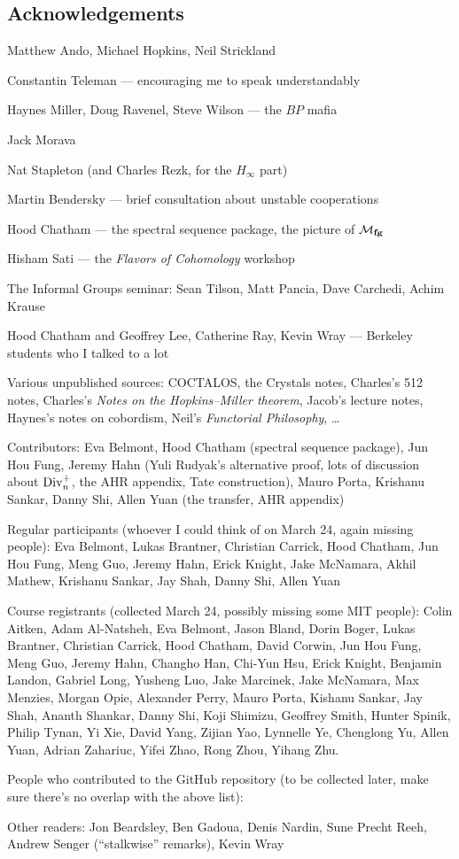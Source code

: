 


\newpage

\subsection*{Acknowledgements}

Matthew Ando, Michael Hopkins, Neil Strickland

Constantin Teleman --- encouraging me to speak understandably

Haynes Miller, Doug Ravenel, Steve Wilson --- the $BP$ mafia

Jack Morava

Nat Stapleton (and Charles Rezk, for the $H_\infty$ part)

Martin Bendersky --- brief consultation about unstable cooperations

Hood Chatham --- the spectral sequence package, the picture of $\mathcal{M}_{\mathbf{fg}}$

Hisham Sati --- the \textit{Flavors of Cohomology} workshop

The Informal Groups seminar: Sean Tilson, Matt Pancia, Dave Carchedi, Achim Krause

Hood Chatham and Geoffrey Lee, Catherine Ray, Kevin Wray --- Berkeley students who I talked to a lot

Various unpublished sources: COCTALOS, the Crystals notes, Charles's 512 notes, Charles's \textit{Notes on the Hopkins--Miller theorem}, Jacob's lecture notes, Haynes's notes on cobordism, Neil's \textit{Functorial Philosophy}, \ldots





Contributors: Eva Belmont, Hood Chatham (spectral sequence package), Jun Hou Fung, Jeremy Hahn (Yuli Rudyak's alternative proof, lots of discussion about $\operatorname{Div}_n^+$, the AHR appendix, Tate construction), Mauro Porta, Krishanu Sankar, Danny Shi, Allen Yuan (the transfer, AHR appendix)

Regular participants (whoever I could think of on March 24, again missing people): Eva Belmont, Lukas Brantner, Christian Carrick, Hood Chatham, Jun Hou Fung, Meng Guo, Jeremy Hahn, Erick Knight, Jake McNamara, Akhil Mathew, Krishanu Sankar, Jay Shah, Danny Shi, Allen Yuan

Course registrants (collected March 24, possibly missing some MIT people): Colin Aitken, Adam Al-Natsheh, Eva Belmont, Jason Bland, Dorin Boger, Lukas Brantner, Christian Carrick, Hood Chatham, David Corwin, Jun Hou Fung, Meng Guo, Jeremy Hahn, Changho Han, Chi-Yun Hsu, Erick Knight, Benjamin Landon, Gabriel Long, Yusheng Luo, Jake Marcinek, Jake McNamara, Max Menzies, Morgan Opie, Alexander Perry, Mauro Porta, Kishanu Sankar, Jay Shah, Ananth Shankar, Danny Shi, Koji Shimizu, Geoffrey Smith, Hunter Spinik, Philip Tynan, Yi Xie, David Yang, Zijian Yao, Lynnelle Ye, Chenglong Yu, Allen Yuan, Adrian Zahariuc, Yifei Zhao, Rong Zhou, Yihang Zhu.

People who contributed to the GitHub repository (to be collected later, make sure there's no overlap with the above list): 

Other readers: Jon Beardsley, Ben Gadoua, Denis Nardin, Sune Precht Reeh, Andrew Senger (``stalkwise'' remarks), Kevin Wray

